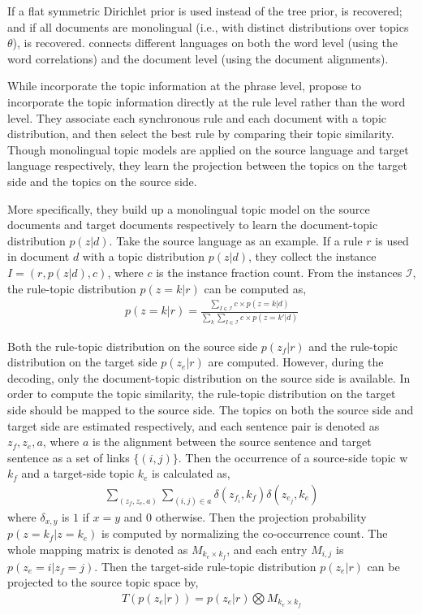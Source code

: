 If a flat symmetric Dirichlet prior is used instead of the tree prior, \plda{} is recovered; and if all documents are monolingual (i.e., with distinct distributions over topics $\theta$), \tlda{} is recovered. \ptlda{} connects different languages on both the word level (using the word correlations) and the document level (using the document alignments).

While \citet{hu-14} incorporate the topic information at the phrase level, \citet{xiao-12} propose to incorporate the topic information directly at the rule level rather than the word level. They associate each synchronous rule and each document with a topic distribution, and then select the best rule by comparing their topic similarity. Though monolingual topic models are applied on the source language and target language respectively, they learn the projection between the topics on the target side and the topics on the source side.

More specifically, they build up a monolingual topic model on the source documents and target documents respectively to learn the document-topic distribution $p(z|d)$. Take the source language as an example. If a rule $r$ is used in document $d$ with a topic distribution $p(z|d)$, they collect the instance $I=(r, p(z|d), c)$, where $c$ is the instance fraction count. From the instances $\mathcal{I}$, the rule-topic distribution $p(z=k|r)$ can be computed as,
\begin{align}
p(z=k|r) = \frac{\sum_{I \in \mathcal{I}} c \times p(z=k|d)}{\sum_k \sum_{I \in \mathcal{I}} c \times p(z=k'|d)}
\end{align}


Both the rule-topic distribution on the source side $p(z_f|r)$ and the rule-topic distribution on the target side $p(z_e|r)$ are computed. However, during the decoding, only the document-topic distribution on the source side is available. In order to compute the topic similarity, the rule-topic distribution on the target side should be mapped to the source side. The topics on both the source side and target side are estimated respectively,  and each sentence pair is denoted as $z_f, z_e, a$, where $a$ is the alignment between the source sentence and target sentence as a set of links $\{(i,j)\}$. Then the occurrence of a source-side topic w$k_f$ and a target-side topic $k_e$ is calculated as,
\begin{align}
\sum_{(z_f,z_e,a)} \sum_{(i,j) \in a} \delta(z_{f_i}, k_f) \delta(z_{e_j}, k_e)
\end{align}
where $\delta_{x,y}$ is $1$ if $x=y$ and $0$ otherwise. Then the projection probability $p(z=k_f | z=k_e)$ is computed by normalizing the co-occurrence count. The whole mapping matrix is denoted as $M_{k_e \times k_f}$, and each entry $M_{i,j}$ is $p(z_e=i | z_f=j)$. Then the target-side rule-topic distribution $p(z_e|r)$ can be projected to the source topic space by,
\begin{align}
T(p(z_e|r)) = p(z_e|r) \bigotimes M_{k_e \times k_f}
\end{align}

